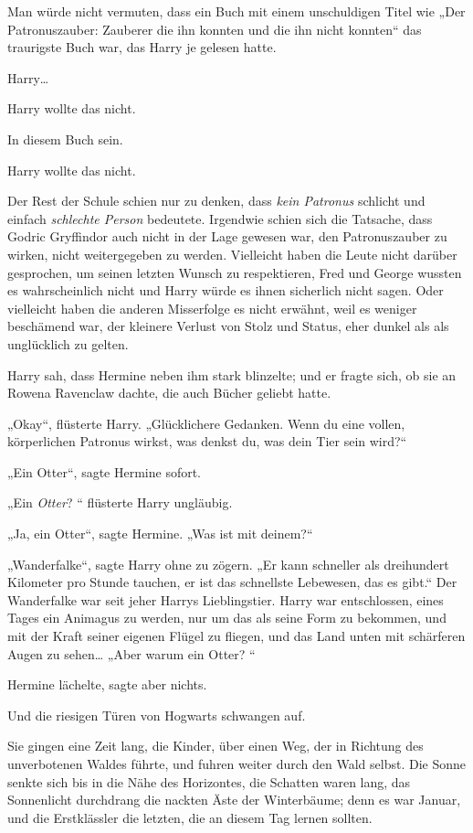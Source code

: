 {Man würde nicht vermuten, dass ein Buch mit einem unschuldigen Titel wie „Der Patronuszauber: Zauberer die ihn konnten und die ihn nicht konnten“ das traurigste Buch war, das Harry je gelesen hatte.

Harry…

Harry wollte das nicht.

In diesem Buch sein.

Harry wollte das nicht.

Der Rest der Schule schien nur zu denken, dass \emph{kein Patronus} schlicht und einfach \emph{schlechte Person} bedeutete. Irgendwie schien sich die Tatsache, dass Godric Gryffindor auch nicht in der Lage gewesen war, den Patronuszauber zu wirken, nicht weitergegeben zu werden. Vielleicht haben die Leute nicht darüber gesprochen, um seinen letzten Wunsch zu respektieren, Fred und George wussten es wahrscheinlich nicht und Harry würde es ihnen sicherlich nicht sagen. Oder vielleicht haben die anderen Misserfolge es nicht erwähnt, weil es weniger beschämend war, der kleinere Verlust von Stolz und Status, eher dunkel als als unglücklich zu gelten.

Harry sah, dass Hermine neben ihm stark blinzelte; und er fragte sich, ob sie an Rowena Ravenclaw dachte, die auch Bücher geliebt hatte.

„Okay“, flüsterte Harry. „Glücklichere Gedanken. Wenn du eine vollen, körperlichen Patronus wirkst, was denkst du, was dein Tier sein wird?“

„Ein Otter“, sagte Hermine sofort.

„Ein \emph{Otter}? “ flüsterte Harry ungläubig.

„Ja, ein Otter“, sagte Hermine. „Was ist mit deinem?“

„Wanderfalke“, sagte Harry ohne zu zögern. „Er kann schneller als dreihundert Kilometer pro Stunde tauchen, er ist das schnellste Lebewesen, das es gibt.“ Der Wanderfalke war seit jeher Harrys Lieblingstier. Harry war entschlossen, eines Tages ein Animagus zu werden, nur um das als seine Form zu bekommen, und mit der Kraft seiner eigenen Flügel zu fliegen, und das Land unten mit schärferen Augen zu sehen… „Aber warum ein Otter? “

Hermine lächelte, sagte aber nichts.

Und die riesigen Türen von Hogwarts schwangen auf.

Sie gingen eine Zeit lang, die Kinder, über einen Weg, der in Richtung des unverbotenen Waldes führte, und fuhren weiter durch den Wald selbst. Die Sonne senkte sich bis in die Nähe des Horizontes, die Schatten waren lang, das Sonnenlicht durchdrang die nackten Äste der Winterbäume; denn es war Januar, und die Erstklässler die letzten, die an diesem Tag lernen sollten.

}
